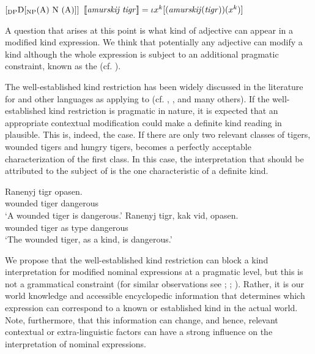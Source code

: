 \documentclass[output=paper
,modfonts
,nonflat]{langsci/langscibook}
\begin{document}
	\ea\label{ex:borik:27}
	\ea
	$[_{\mbox{\scriptsize{DP}}} \mbox{D} [_{\mbox{\scriptsize{NP}}} \mbox{(A) N (A)}]]$
	\ex
	$[\![\mbox{\textit{amurskij tigr}}]\!] = \iota{x^k}[\mbox{(\textit{amurskij}(\textit{tigr}))}(x^k)]$
	\z
	\z
	
	A question that arises at this point is what kind of adjective can appear in a modified kind expression. We think that potentially any adjective can modify a kind although the whole expression is subject to an additional pragmatic constraint, known as the (cf. \citealt{KrifkaEtAlii1995}). 
	
	The well-established kind restriction has been widely discussed in the literature for  and other languages as applying to  (cf. \citealt{Vergnaud1992}, \citealt{KrifkaEtAlii1995}, \citealt{Dayal2004} and many others). If the well-established kind restriction is pragmatic in nature, it is expected that an appropriate contextual modification could make a definite kind reading in  plausible. This is, indeed, the case. If there are only two relevant classes of tigers, wounded tigers and hungry tigers,  becomes a perfectly acceptable characterization of the first class. In this case, the interpretation that should be attributed to the subject of  is the one characteristic of a definite kind.
	
	\ea\label{ex:borik:28}
	\ea\label{ex:borik:28a}
	\gll Ranenyj 	tigr 	opasen. 	\\		 
	wounded 	tiger 	dangerous\\
	\glt `A wounded tiger is dangerous.'
	\ex\label{ex:borik:28b}
	\gll Ranenyj 	tigr, kak 	vid, 	opasen. \\		
	wounded 	tiger as 	type	dangerous\\
	\glt `The wounded tiger, as a kind, is dangerous.'
	\z
	\z
	
	We propose that the well-established kind restriction can block a kind interpretation for modified nominal expressions at a pragmatic level, but this is not a grammatical constraint (for similar observations see \citealt{Dayal1992}; \citealt[69]{KrifkaEtAlii1995}; \citealt[footnote 30]{Dayal2004}). Rather, it is our world knowledge and accessible encyclopedic information that determines which expression can correspond to a known or established kind in the actual world. Note, furthermore, that this information can change, and hence, relevant contextual or extra-linguistic factors can have a strong influence on the interpretation of nominal expressions. 
	
\end{document}

